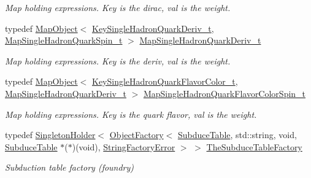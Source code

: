 \begin{DoxyCompactItemize}
\begin{DoxyCompactList}\small\item\em Map holding expressions. Key is the dirac, val is the weight. \end{DoxyCompactList}\item 
typedef \mbox{\hyperlink{classADAT_1_1MapObject}{Map\+Object}}$<$ \mbox{\hyperlink{structHadron_1_1KeySingleHadronQuarkDeriv__t}{Key\+Single\+Hadron\+Quark\+Deriv\+\_\+t}}, \mbox{\hyperlink{namespaceHadron_a22279e56b59508dc8dd2c8991dc911fd}{Map\+Single\+Hadron\+Quark\+Spin\+\_\+t}} $>$ \mbox{\hyperlink{namespaceHadron_aa588220689caea8a6aad4d0296526e6b}{Map\+Single\+Hadron\+Quark\+Deriv\+\_\+t}}
\begin{DoxyCompactList}\small\item\em Map holding expressions. Key is the deriv, val is the weight. \end{DoxyCompactList}\item 
typedef \mbox{\hyperlink{classADAT_1_1MapObject}{Map\+Object}}$<$ \mbox{\hyperlink{structHadron_1_1KeySingleHadronQuarkFlavorColor__t}{Key\+Single\+Hadron\+Quark\+Flavor\+Color\+\_\+t}}, \mbox{\hyperlink{namespaceHadron_aa588220689caea8a6aad4d0296526e6b}{Map\+Single\+Hadron\+Quark\+Deriv\+\_\+t}} $>$ \mbox{\hyperlink{namespaceHadron_a03b319764f85c20434f20a269ce5f388}{Map\+Single\+Hadron\+Quark\+Flavor\+Color\+Spin\+\_\+t}}
\begin{DoxyCompactList}\small\item\em Map holding expressions. Key is the quark flavor, val is the weight. \end{DoxyCompactList}\item 
typedef \mbox{\hyperlink{classUtil_1_1SingletonHolder}{Singleton\+Holder}}$<$ \mbox{\hyperlink{classUtil_1_1ObjectFactory}{Object\+Factory}}$<$ \mbox{\hyperlink{classHadron_1_1SubduceTable}{Subduce\+Table}}, std\+::string, void, \mbox{\hyperlink{classHadron_1_1SubduceTable}{Subduce\+Table}} $\ast$($\ast$)(void), \mbox{\hyperlink{structUtil_1_1StringFactoryError}{String\+Factory\+Error}} $>$ $>$ \mbox{\hyperlink{namespaceHadron_a48cb722d69c0afc5a2ebda0eaf6fea13}{The\+Subduce\+Table\+Factory}}
\begin{DoxyCompactList}\small\item\em Subduction table factory (foundry) \end{DoxyCompactList}\end{DoxyCompactItemize}
